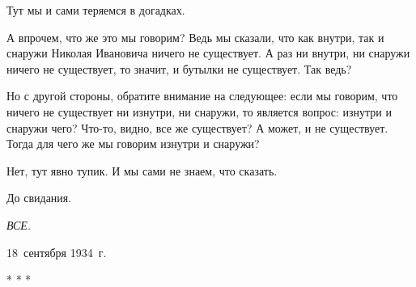 Тут мы и сами теряемся в догадках.

А впрочем, что же это мы говорим? Ведь мы сказали, что как внутри, так и снаружи Николая Ивановича ничего не существует. А раз ни внутри, ни снаружи ничего не существует, то значит, и бутылки не существует. Так ведь?

Но с другой стороны, обратите внимание на следующее: если мы говорим, что ничего не существует ни изнутри, ни снаружи, то является вопрос: изнутри и снаружи чего? Что-то, видно, все же существует? А может, и не существует. Тогда для чего же мы говорим изнутри и снаружи?

Нет, тут явно тупик. И мы сами не знаем, что сказать.

До свидания.

\begin{center}
\textit{ВСЕ.}
\end{center}

\begin{flushright}
18~сентября 1934~г.
\end{flushright}

\begin{center}
* * *
\end{center}
